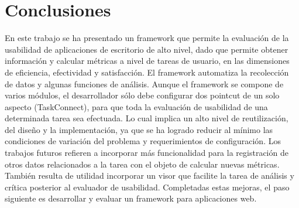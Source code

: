 \section{Conclusiones}
\label{sec:conclusiones}
En este trabajo se ha presentado un framework que permite la evaluación de la usabilidad de aplicaciones de escritorio de alto nivel, dado que permite obtener información y calcular métricas a nivel de tareas de usuario, en las dimensiones de eficiencia, efectividad y satisfacción. El framework automatiza la recolección de datos y algunas funciones de análisis. Aunque el framework se compone de varios módulos, el desarrollador sólo debe configurar dos pointcut de un solo aspecto (TaskConnect), para que toda la evaluación de usabilidad de una determinada tarea sea efectuada. Lo cual implica un alto nivel de reutilización, del diseño y la implementación, ya que se ha logrado reducir al mínimo las condiciones de variación del problema y requerimientos de configuración. 
Los trabajos futuros refieren a incorporar más funcionalidad para la registración de otros datos relacionados a la tarea con el objeto de calcular nuevas métricas. También resulta de utilidad incorporar un visor que facilite la tarea de análisis y crítica posterior al evaluador de usabilidad. Completadas estas mejoras, el paso siguiente es desarrollar y evaluar un framework para aplicaciones web.
